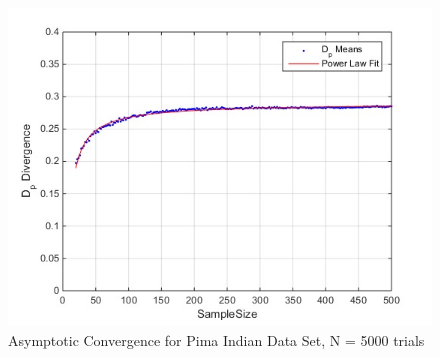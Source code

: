 \documentclass{article}
\begin{document}
	\begin{figure}[!h]
		\caption{Asymptotic Convergence for Pima Indian Data Set, N = 5000 trials}
		\centering
		\includegraphics[scale=0.6]{dp_n5000_pima}
	\end{figure}	
	
	
\end{document}
